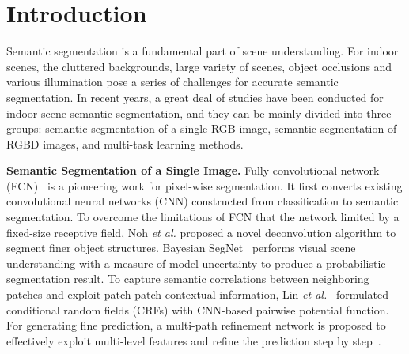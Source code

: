 \section{Introduction}
\label{sec:intro}
%

Semantic segmentation is a fundamental part of scene understanding.
%
For indoor scenes, the cluttered backgrounds, large variety of scenes, object occlusions and various illumination pose a series of challenges for accurate semantic segmentation.
%
In recent years, a great deal of studies have been conducted for indoor scene semantic segmentation, and they can be mainly divided into three groups: semantic segmentation of a single RGB image, semantic segmentation of RGBD images, and multi-task learning methods.
%



\noindent \textbf{Semantic Segmentation of a Single Image.}
%
Fully convolutional network (FCN)~\cite{Long2015} is a pioneering work for pixel-wise segmentation. It first converts existing convolutional neural networks (CNN) constructed from classification to semantic segmentation.
%
To overcome the limitations of FCN that the network limited by a fixed-size receptive field, Noh \emph{et al.} \cite{Noh2015} proposed a novel deconvolution algorithm to segment finer object structures.
%
Bayesian SegNet~\cite{Kendall2015} performs visual scene understanding with a measure of model uncertainty to produce a probabilistic segmentation result.
%
To capture semantic correlations between neighboring patches and exploit patch-patch contextual information, Lin \emph{et al.}~\cite{Lin2016} formulated conditional random fields (CRFs) with CNN-based pairwise potential function. 
%
For generating fine prediction, a multi-path refinement network is proposed to effectively exploit multi-level features and refine the prediction step by step~\cite{Lin2017}.
%

